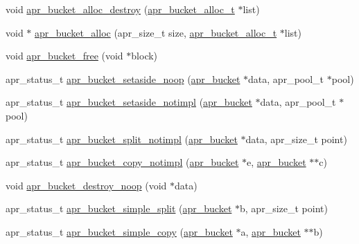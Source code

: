 \begin{DoxyCompactItemize}
\item 
void \hyperlink{group___a_p_r___util___bucket___brigades_gaf5eb58cc232851c8449ba1d98d049a0a}{apr\-\_\-bucket\-\_\-alloc\-\_\-destroy} (\hyperlink{group___a_p_r___util___bucket___brigades_ga9a30babfeb6e290db124d8f9b69e49e4}{apr\-\_\-bucket\-\_\-alloc\-\_\-t} $\ast$list)
\item 
void $\ast$ \hyperlink{group___a_p_r___util___bucket___brigades_gae47c2235a3740432f4a0990fccfe4102}{apr\-\_\-bucket\-\_\-alloc} (apr\-\_\-size\-\_\-t size, \hyperlink{group___a_p_r___util___bucket___brigades_ga9a30babfeb6e290db124d8f9b69e49e4}{apr\-\_\-bucket\-\_\-alloc\-\_\-t} $\ast$list)
\item 
void \hyperlink{group___a_p_r___util___bucket___brigades_ga951beb3a8249648214e130ab06275a3a}{apr\-\_\-bucket\-\_\-free} (void $\ast$block)
\item 
apr\-\_\-status\-\_\-t \hyperlink{group___a_p_r___util___bucket___brigades_gae6135b83d9f7bd7e1b60dbc761a3ca5f}{apr\-\_\-bucket\-\_\-setaside\-\_\-noop} (\hyperlink{structapr__bucket}{apr\-\_\-bucket} $\ast$data, apr\-\_\-pool\-\_\-t $\ast$pool)
\item 
apr\-\_\-status\-\_\-t \hyperlink{group___a_p_r___util___bucket___brigades_gade52b057161f657a6b298d9c6a78b339}{apr\-\_\-bucket\-\_\-setaside\-\_\-notimpl} (\hyperlink{structapr__bucket}{apr\-\_\-bucket} $\ast$data, apr\-\_\-pool\-\_\-t $\ast$pool)
\item 
apr\-\_\-status\-\_\-t \hyperlink{group___a_p_r___util___bucket___brigades_ga305766ff39440711da93e72f5b348a3a}{apr\-\_\-bucket\-\_\-split\-\_\-notimpl} (\hyperlink{structapr__bucket}{apr\-\_\-bucket} $\ast$data, apr\-\_\-size\-\_\-t point)
\item 
apr\-\_\-status\-\_\-t \hyperlink{group___a_p_r___util___bucket___brigades_ga5fc17c10cee2abf02557669f6f507e89}{apr\-\_\-bucket\-\_\-copy\-\_\-notimpl} (\hyperlink{structapr__bucket}{apr\-\_\-bucket} $\ast$e, \hyperlink{structapr__bucket}{apr\-\_\-bucket} $\ast$$\ast$c)
\item 
void \hyperlink{group___a_p_r___util___bucket___brigades_ga09221bea9541ca2340a4e8b5e1e7ac56}{apr\-\_\-bucket\-\_\-destroy\-\_\-noop} (void $\ast$data)
\item 
apr\-\_\-status\-\_\-t \hyperlink{group___a_p_r___util___bucket___brigades_ga9fd8c7d9e42dd04b8f153072655e875c}{apr\-\_\-bucket\-\_\-simple\-\_\-split} (\hyperlink{structapr__bucket}{apr\-\_\-bucket} $\ast$b, apr\-\_\-size\-\_\-t point)
\item 
apr\-\_\-status\-\_\-t \hyperlink{group___a_p_r___util___bucket___brigades_ga123c95e832734f92e6f1139b6a68cfa6}{apr\-\_\-bucket\-\_\-simple\-\_\-copy} (\hyperlink{structapr__bucket}{apr\-\_\-bucket} $\ast$a, \hyperlink{structapr__bucket}{apr\-\_\-bucket} $\ast$$\ast$b)

\end{DoxyCompactItemize}
